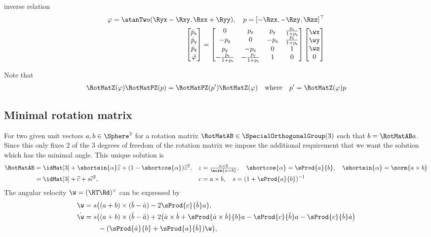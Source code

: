 inverse relation
\begin{align}
 \varphi = \atanTwo(\Ryx-\Rxy, \Rxx+\Ryy), \quad p = [-\Rzx, -\Rzy, \Rzz]^\top
\\
 \begin{bmatrix} \dot{p}_\mathsf{x} \\ \dot{p}_\mathsf{y} \\ \dot{p}_\mathsf{z} \\ \dot{\varphi} \end{bmatrix}
 =
 \begin{bmatrix}
  0 & p_\mathsf{z} & p_\mathsf{y} & \tfrac{p_\mathsf{x}}{1+p_\mathsf{z}} \\
  -p_\mathsf{z} & 0 & -p_\mathsf{x} & \tfrac{p_\mathsf{y}}{1+p_\mathsf{z}} \\
  p_\mathsf{y} & -p_\mathsf{x} & 0 & 1 \\
  -\tfrac{p_\mathsf{x}}{1+p_\mathsf{z}} & -\tfrac{p_\mathsf{y}}{1+p_\mathsf{z}} & 1 & 0 \\
 \end{bmatrix}
 \begin{bmatrix} \wx \\ \wy \\ \wz \\ 0 \end{bmatrix}
\end{align}


Note that
\begin{align}
 \RotMatZ(\varphi) \RotMatPZ(p) = \RotMatPZ(p') \RotMatZ(\varphi) \quad \text{where} \quad p' = \RotMatZ(\varphi) p
\end{align}

\subsection{Minimal rotation matrix}
For two given unit vectors $a,b \in \Sphere^2$ for a rotation matrix $\RotMatAB \in \SpecialOrthogonalGroup(3)$ such that $b = \RotMatAB a$.
Since this only fixes 2 of the 3 degrees of freedom of the rotation matrix we impose the additional requirement that we want the solution which has the minimal angle.
This unique solution is
\begin{align}
 \RotMatAB &= \idMat[3] + \shortsin{\alpha} \widehat{z} + (1-\shortcos{\alpha}) \widehat{z}^2,&
 z &= \tfrac{a \times b}{\norm{a\times b}}, \quad \shortcos{\alpha} = \sProd{a}{b}, \quad \shortsin{\alpha} = \norm{a\times b}
\\
 &= \idMat[3] + \widehat{c} + s \widehat{c}^2,&
 c &= a\times b, \quad s = (1 + \sProd{a}{b})^{-1}
\end{align}
The angular velocity $\w = (\RT \Rd)^\vee$ can be expressed by
\begin{align}
 \w &= s \big( (a+b) \times (\dot{b} - \dot{a}) - 2 \sProd{c}{\dot{b}} a \big),
\\
 \dot{\w} &= s \big( (a+b) \times (\ddot{b} - \ddot{a}) + 2 \big( \dot{a} \times \dot{b} + \sProd{\dot{a} \times \dot{b}}{b} a - \sProd{c}{\ddot{b}} a - \sProd{c}{\dot{b}} \dot{a} \big)
\nonumber\\
&\qquad - (\sProd{\dot{a}}{b} + \sProd{a}{\dot{b}})\w \big),
\end{align}